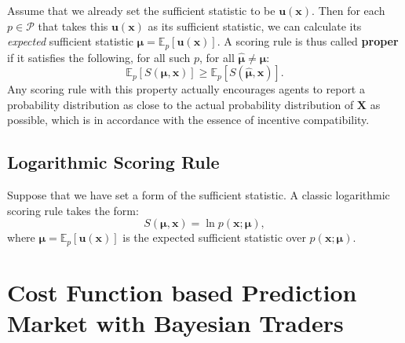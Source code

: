 \documentclass[12pt]{article}
\begin{document}
Assume that we already set the sufficient statistic to be $\mathbf{u}(\mathbf{x})$. Then for each $p\in \mathcal{P}$ that takes this $\mathbf{u}(\mathbf{x})$ as its sufficient statistic, we can calculate its \textit{expected} sufficient statistic $\bm{\mu}=\mathbb{E}_p[\mathbf{u}(\mathbf{x})]$. A scoring rule is thus called \textbf{proper} if it satisfies the following, for all such $p$, for all $\bm{\hat{\mu}}\neq\bm{\mu}$:
\[\mathbb{E}_p[S(\bm{\mu},\mathbf{x})]\geqslant \mathbb{E}_p[S(\bm{\hat{\mu}},\mathbf{x})].\]
Any scoring rule with this property actually encourages agents to report a probability distribution as close to the actual probability distribution of $\mathbf{X}$ as possible, which is in accordance with the essence of incentive compatibility.

\subsection{Logarithmic Scoring Rule}
Suppose that we have set a form of the sufficient statistic. A classic logarithmic scoring rule takes the form:
\[S(\bm{\mu},\mathbf{x})=\ln p(\mathbf{x};\bm{\mu}),\]
where $\bm{\mu}=\mathbb{E}_p[\mathbf{u}(\mathbf{x})]$ is the expected sufficient statistic over $p(\mathbf{x};\bm{\mu})$.

\newpage
\section{Cost Function based Prediction Market with Bayesian Traders}
\end{document}
